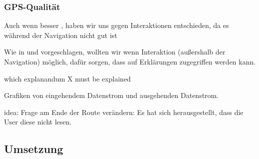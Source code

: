 \subsubsection{GPS-Qualität}
\label{sec:gps_accuracy_definition}

Auch wenn besser \cite{riveiro_thats_2021}, haben wir uns gegen Interaktionen entschieden, da es während der Navigation nicht gut ist

Wie in \cite{chazette_end-users_nodate} und \cite{wang_integration_2020} vorgeschlagen, wollten wir wenn Interaktion (außershalb der Navigation) möglich, dafür sorgen, dass auf Erklärungen zugegriffen werden kann.

which explanandum X must be explained \cite{kohl_explainability_2019}

Grafiken von eingehendem Datenstrom und ausgehenden Datenstrom.

idea: Frage am Ende der Route verändern: Es hat sich herausgestellt, dass die User diese nicht lesen.

\subsection{Umsetzung}